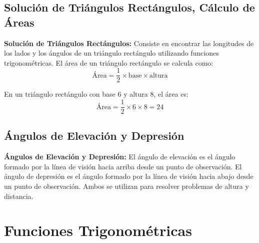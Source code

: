 \subsection{Solución de Triángulos Rectángulos, Cálculo de Áreas}

\begin{definition}
    \textbf{Solución de Triángulos Rectángulos:} Consiste en encontrar las longitudes de los lados y los ángulos de un triángulo rectángulo utilizando funciones trigonométricas. El área de un triángulo rectángulo se calcula como:
    \[
    \text{Área} = \frac{1}{2} \times \text{base} \times \text{altura}
    \]
\end{definition}

\begin{example}
    En un triángulo rectángulo con base 6 y altura 8, el área es:
    \[
    \text{Área} = \frac{1}{2} \times 6 \times 8 = 24
    \]
\end{example}

\subsection{Ángulos de Elevación y Depresión}

\begin{definition}
    \textbf{Ángulos de Elevación y Depresión:} El ángulo de elevación es el ángulo formado por la línea de visión hacia arriba desde un punto de observación. El ángulo de depresión es el ángulo formado por la línea de visión hacia abajo desde un punto de observación. Ambos se utilizan para resolver problemas de altura y distancia.
\end{definition}



\section{Funciones Trigonométricas} %

